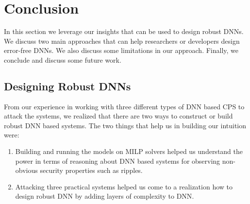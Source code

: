 \chapter{Conclusion}
\label{conclusion}

In this section we leverage our insights that can be used to design robust \ac{DNN}s. 
We discuss two main approaches that can help researchers or developers design error-free \ac{DNN}s. 
We also discuss some limitations in our approach.
Finally, we conclude and discuss some future work.


\section{Designing Robust DNNs}
From our experience in working with three different types of \ac{DNN} based CPS to attack the systems, we realized that there are two ways to construct or build robust \ac{DNN} based systems. 
The two things that help us in building our intuition were:
\begin{enumerate}
	\item Building and running the models on \ac{MILP} solvers helped us understand the power in terms of reasoning about \ac{DNN} based systems for observing non-obvious security properties such as ripples. 
	\item Attacking three practical systems helped  us come to a realization how to design robust \ac{DNN}  by adding layers of complexity to \ac{DNN}. 
\end{enumerate}


